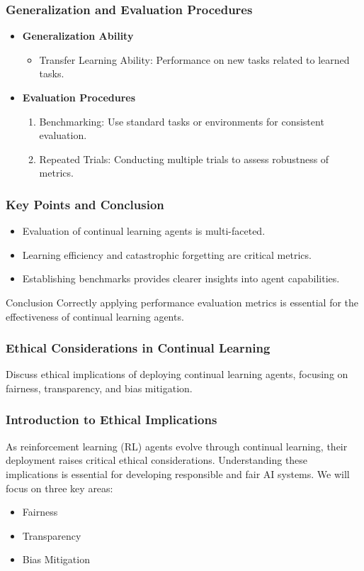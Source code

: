 \documentclass[aspectratio=169]{beamer}
\begin{document}
\begin{frame}[fragile]
    \frametitle{Generalization and Evaluation Procedures}
    \begin{itemize}
        \item \textbf{Generalization Ability}
            \begin{itemize}
                \item Transfer Learning Ability: Performance on new tasks related to learned tasks.
            \end{itemize}
        \item \textbf{Evaluation Procedures}
            \begin{enumerate}
                \item Benchmarking: Use standard tasks or environments for consistent evaluation.
                \item Repeated Trials: Conducting multiple trials to assess robustness of metrics.
            \end{enumerate}
    \end{itemize}
\end{frame}

\begin{frame}[fragile]
    \frametitle{Key Points and Conclusion}
    \begin{itemize}
        \item Evaluation of continual learning agents is multi-faceted.
        \item Learning efficiency and catastrophic forgetting are critical metrics.
        \item Establishing benchmarks provides clearer insights into agent capabilities.
    \end{itemize}
    \begin{block}{Conclusion}
        Correctly applying performance evaluation metrics is essential for the effectiveness of continual learning agents.
    \end{block}
\end{frame}

\begin{frame}[fragile]
    \frametitle{Ethical Considerations in Continual Learning}
    Discuss ethical implications of deploying continual learning agents, focusing on fairness, transparency, and bias mitigation.
\end{frame}

\begin{frame}[fragile]
    \frametitle{Introduction to Ethical Implications}
    As reinforcement learning (RL) agents evolve through continual learning, their deployment raises critical ethical considerations. 
    Understanding these implications is essential for developing responsible and fair AI systems. We will focus on three key areas:
    \begin{itemize}
        \item Fairness
        \item Transparency
        \item Bias Mitigation
    \end{itemize}
\end{frame}
\end{document}
